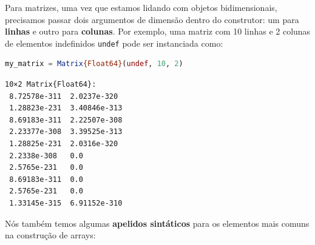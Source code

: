 \documentclass[
  notoc %
]{tufte-book}
\newcommand{\passthrough}[1]{#1}
\begin{document}
Para matrizes, uma vez que estamos lidando com objetos bidimensionais,
precisamos passar dois argumentos de dimensão dentro do construtor: um
para \textbf{linhas} e outro para \textbf{colunas}. Por exemplo, uma
matriz com 10 linhas e 2 colunas de elementos indefinidos
\passthrough{\lstinline!undef!} pode ser instanciada como:

\begin{lstlisting}[language=Julia]
my_matrix = Matrix{Float64}(undef, 10, 2)
\end{lstlisting}

\begin{lstlisting}[language=Output]
10×2 Matrix{Float64}:
 8.72578e-311  2.0237e-320
 1.28823e-231  3.40846e-313
 8.69183e-311  2.22507e-308
 2.23377e-308  3.39525e-313
 1.28825e-231  2.0316e-320
 2.2338e-308   0.0
 2.5765e-231   0.0
 8.69183e-311  0.0
 2.5765e-231   0.0
 1.33145e-315  6.91152e-310
\end{lstlisting}

Nós também temos algumas \textbf{apelidos sintáticos} para os elementos
mais comuns na construção de arrays:
\end{document}
